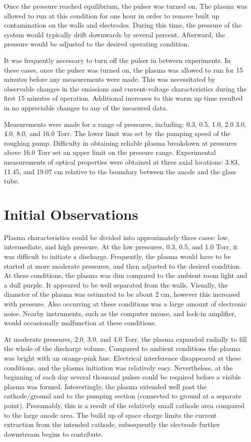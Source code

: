 Once the pressure reached equilibrium, the pulser was turned on. The plasma was
allowed to run at this condition for one hour in order to remove built up
contamination on the walls and electrodes. During this time, the pressure of the
system would typically drift downwards by several percent. Afterward, the
pressure would be adjusted to the desired operating condition.

It was frequently necessary to turn off the pulser in between experiments. In
these cases, once the pulser was turned on, the plasma was allowed to run for 15
minutes before any measurements were made. This was necessitated by observable
changes in the emissions and current-voltage characteristics during the first 15
minutes of operation. Additional increases to this warm up time resulted in no
appreciable changes to any of the measured data.

Measurements were made for a range of pressures, including: 0.3, 0.5, 1.0, 2.0
3.0, 4.0, 8.0, and 16.0 Torr. The lower limit was set by the pumping speed of
the roughing pump. Difficulty in obtaining reliable plasma breakdown at
pressures above 16.0 Torr set an upper limit on the pressure range. Experimental
measurements of optical properties were obtained at three axial locations: 3.83,
11.45, and 19.07 cm relative to the boundary between the anode and the glass
tube.

\section{Initial Observations}

Plasma characteristics could be divided into approximately three cases: low,
intermediate, and high pressure. At the low pressures, 0.3, 0.5, and 1.0 Torr,
it was difficult to initiate a discharge. Frequently, the plasma would have to
be started at more moderate pressures, and then adjusted to the desired
condition. At these conditions, the plasma was dim compared to the ambient room
light and a dull purple. It appeared to be well separated from the walls.
Visually, the diameter of the plasma was estimated to be about 2 cm, however
this increased with pressure. Also occurring at these conditions was a large
amount of electronic noise. Nearby instruments, such as the computer mouse, and
lock-in amplifier, would occasionally malfunction at these conditions.

At moderate pressures, 2.0, 3.0, and 4.0 Torr, the plasma expanded radially to
fill the whole of the discharge volume. Compared to ambient conditions the
plasma was bright with an orange-pink hue. Electrical interference disappeared
at these conditions, and the plasma initiation was relatively easy.
Nevertheless, at the beginning of each day several thousand pulses could be
required before a visible plasma was formed. Interestingly, the plasma extended
well past the cathode/ground and to the pumping section (connected to ground at
a separate point). Presumably, this is a result of the relatively small cathode
area compared to the large anode area. The build up of space charge limits the
current extraction from the intended cathode, subsequently the electrode further
downstream begins to contribute.

